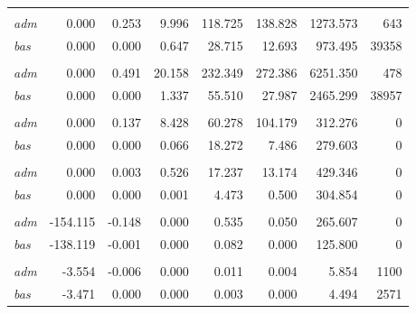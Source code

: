 \documentclass[a4paper,11pt]{article}
\begin{document}
\begin{longtable}[t]{lrrrrrrr}
\endfoot
\bottomrule
\endlastfoot
\addlinespace[0.3em]
\multicolumn{8}{l}{\textbf{AGRET}}\\
\hspace{1em}\textit{adm} & 0.000 & 0.253 & 9.996 & 118.725 & 138.828 & 1273.573 & 643\\
\hspace{1em}\textit{bas} & 0.000 & 0.000 & 0.647 & 28.715 & 12.693 & 973.495 & 39358\\
\addlinespace[0.3em]
\multicolumn{8}{l}{\textbf{AGRGPP}}\\
\hspace{1em}\textit{adm} & 0.000 & 0.491 & 20.158 & 232.349 & 272.386 & 6251.350 & 478\\
\hspace{1em}\textit{bas} & 0.000 & 0.000 & 1.337 & 55.510 & 27.987 & 2465.299 & 38957\\
\addlinespace[0.3em]
\multicolumn{8}{l}{\textbf{AGRLST}}\\
\hspace{1em}\textit{adm} & 0.000 & 0.137 & 8.428 & 60.278 & 104.179 & 312.276 & 0\\
\hspace{1em}\textit{bas} & 0.000 & 0.000 & 0.066 & 18.272 & 7.486 & 279.603 & 0\\
\addlinespace[0.3em]
\multicolumn{8}{l}{\textbf{AGRPREC}}\\
\hspace{1em}\textit{adm} & 0.000 & 0.003 & 0.526 & 17.237 & 13.174 & 429.346 & 0\\
\hspace{1em}\textit{bas} & 0.000 & 0.000 & 0.001 & 4.473 & 0.500 & 304.854 & 0\\
\addlinespace[0.3em]
\multicolumn{8}{l}{\textbf{AGRANOM}}\\
\hspace{1em}\textit{adm} & -154.115 & -0.148 & 0.000 & 0.535 & 0.050 & 265.607 & 0\\
\hspace{1em}\textit{bas} & -138.119 & -0.001 & 0.000 & 0.082 & 0.000 & 125.800 & 0\\
\addlinespace[0.3em]
\multicolumn{8}{l}{\textbf{AGRSPI1}}\\
\hspace{1em}\textit{adm} & -3.554 & -0.006 & 0.000 & 0.011 & 0.004 & 5.854 & 1100\\
\hspace{1em}\textit{bas} & -3.471 & 0.000 & 0.000 & 0.003 & 0.000 & 4.494 & 2571\\

\end{longtable}
\end{document}
